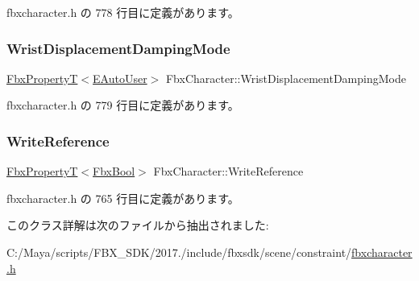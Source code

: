  fbxcharacter.\+h の 778 行目に定義があります。

\mbox{\label{class_fbx_character_a9b406a1fb80fcc2f48239a80c14ee472}} 
\subsubsection{\texorpdfstring{Wrist\+Displacement\+Damping\+Mode}{WristDisplacementDampingMode}}
{\footnotesize\ttfamily \hyperlink{class_fbx_property_t}{Fbx\+PropertyT}$<$\hyperlink{class_fbx_character_a5b03462709a82a15d89ee4563a4c49df}{E\+Auto\+User}$>$ Fbx\+Character\+::\+Wrist\+Displacement\+Damping\+Mode}



 fbxcharacter.\+h の 779 行目に定義があります。

\mbox{\label{class_fbx_character_a2c1620d6f4dc641672afb3243ae008c3}} 
\subsubsection{\texorpdfstring{Write\+Reference}{WriteReference}}
{\footnotesize\ttfamily \hyperlink{class_fbx_property_t}{Fbx\+PropertyT}$<$\hyperlink{fbxtypes_8h_a92e0562b2fe33e76a242f498b362262e}{Fbx\+Bool}$>$ Fbx\+Character\+::\+Write\+Reference}



 fbxcharacter.\+h の 765 行目に定義があります。



このクラス詳解は次のファイルから抽出されました\+:\begin{DoxyCompactItemize}
\item 
C\+:/\+Maya/scripts/\+F\+B\+X\+\_\+\+S\+D\+K/2017./include/fbxsdk/scene/constraint/\hyperlink{fbxcharacter_8h}{fbxcharacter.\+h}\end{DoxyCompactItemize}
